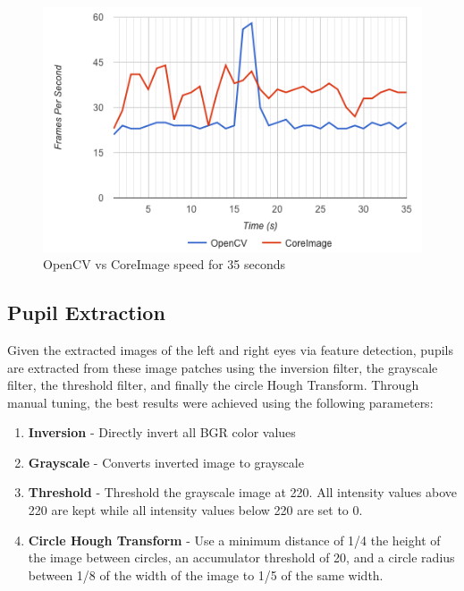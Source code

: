 \documentclass[10pt,twocolumn,letterpaper]{article}
\begin{document}
\begin{figure}[t!]
\centering    
\includegraphics[scale=0.5]{instruments}
\caption{OpenCV vs CoreImage speed for 35 seconds}
\label{instruments}
\end{figure}

\subsection{Pupil Extraction}
Given the extracted images of the left and right eyes via feature detection, pupils are extracted from these image patches using the inversion filter, the grayscale filter, the threshold filter, and finally the circle Hough Transform. Through manual tuning, the best results were achieved using the following parameters:

\begin{enumerate}
\item \textbf{Inversion} - Directly invert all BGR color values
\item \textbf{Grayscale} - Converts inverted image to grayscale
\item \textbf{Threshold} - Threshold the grayscale image at 220.  All intensity values above 220 are kept while all intensity values below 220 are set to 0.
\item \textbf{Circle Hough Transform} - Use a minimum distance of 1/4 the height of the image between circles, an accumulator threshold of 20, and a circle radius between 1/8 of the width of the image to 1/5 of the same width.
\end{enumerate}
\end{document}
